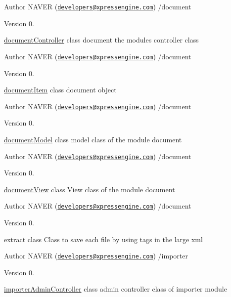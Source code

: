 \begin{DoxyAuthor}{Author}
N\+A\+V\+E\+R (\href{mailto:developers@xpressengine.com}{\tt developers@xpressengine.\+com}) /document 
\end{DoxyAuthor}
\begin{DoxyVersion}{Version}
0.
\end{DoxyVersion}
\hyperlink{classdocumentController}{document\+Controller} class document the module\textquotesingle{}s controller class

\begin{DoxyAuthor}{Author}
N\+A\+V\+E\+R (\href{mailto:developers@xpressengine.com}{\tt developers@xpressengine.\+com}) /document 
\end{DoxyAuthor}
\begin{DoxyVersion}{Version}
0.
\end{DoxyVersion}
\hyperlink{classdocumentItem}{document\+Item} class document object

\begin{DoxyAuthor}{Author}
N\+A\+V\+E\+R (\href{mailto:developers@xpressengine.com}{\tt developers@xpressengine.\+com}) /document 
\end{DoxyAuthor}
\begin{DoxyVersion}{Version}
0.
\end{DoxyVersion}
\hyperlink{classdocumentModel}{document\+Model} class model class of the module document

\begin{DoxyAuthor}{Author}
N\+A\+V\+E\+R (\href{mailto:developers@xpressengine.com}{\tt developers@xpressengine.\+com}) /document 
\end{DoxyAuthor}
\begin{DoxyVersion}{Version}
0.
\end{DoxyVersion}
\hyperlink{classdocumentView}{document\+View} class View class of the module document

\begin{DoxyAuthor}{Author}
N\+A\+V\+E\+R (\href{mailto:developers@xpressengine.com}{\tt developers@xpressengine.\+com}) /document 
\end{DoxyAuthor}
\begin{DoxyVersion}{Version}
0.
\end{DoxyVersion}
extract class Class to save each file by using tags in the large xml

\begin{DoxyAuthor}{Author}
N\+A\+V\+E\+R (\href{mailto:developers@xpressengine.com}{\tt developers@xpressengine.\+com}) /importer 
\end{DoxyAuthor}
\begin{DoxyVersion}{Version}
0.
\end{DoxyVersion}
\hyperlink{classimporterAdminController}{importer\+Admin\+Controller} class admin controller class of importer module

